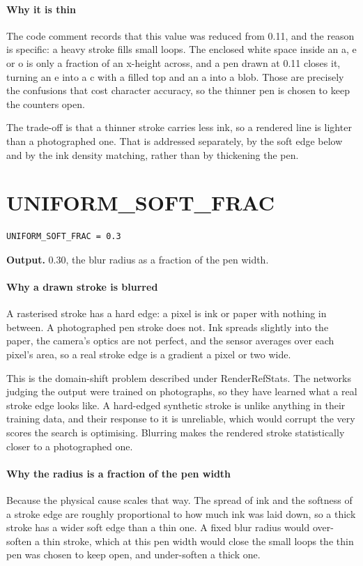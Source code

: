 \paragraph{Why it is thin}
The code comment records that this value was reduced from 0.11, and the reason is specific: a heavy stroke fills small loops. The enclosed white space inside an a, e or o is only a fraction of an x-height across, and a pen drawn at 0.11 closes it, turning an e into a c with a filled top and an a into a blob. Those are precisely the confusions that cost character accuracy, so the thinner pen is chosen to keep the counters open.

The trade-off is that a thinner stroke carries less ink, so a rendered line is lighter than a photographed one. That is addressed separately, by the soft edge below and by the ink density matching, rather than by thickening the pen.


\section{UNIFORM\_SOFT\_FRAC}
\begin{lstlisting}[style=sig]
UNIFORM_SOFT_FRAC = 0.3
\end{lstlisting}

\noindent\textbf{Output.} 0.30, the blur radius as a fraction of the pen width.


\paragraph{Why a drawn stroke is blurred}
A rasterised stroke has a hard edge: a pixel is ink or paper with nothing in between. A photographed pen stroke does not. Ink spreads slightly into the paper, the camera's optics are not perfect, and the sensor averages over each pixel's area, so a real stroke edge is a gradient a pixel or two wide.

This is the domain-shift problem described under RenderRefStats. The networks judging the output were trained on photographs, so they have learned what a real stroke edge looks like. A hard-edged synthetic stroke is unlike anything in their training data, and their response to it is unreliable, which would corrupt the very scores the search is optimising. Blurring makes the rendered stroke statistically closer to a photographed one.


\paragraph{Why the radius is a fraction of the pen width}
Because the physical cause scales that way. The spread of ink and the softness of a stroke edge are roughly proportional to how much ink was laid down, so a thick stroke has a wider soft edge than a thin one. A fixed blur radius would over-soften a thin stroke, which at this pen width would close the small loops the thin pen was chosen to keep open, and under-soften a thick one.


